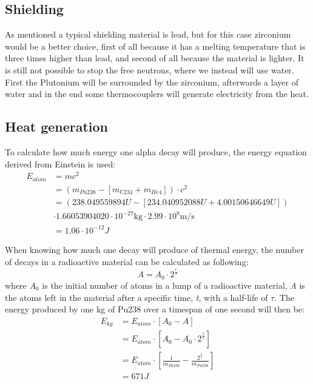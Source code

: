 \subsection{Shielding}
As mentioned a typical shielding material is lead, but for this case zirconium would be a better choice, first of all because it has a melting temperature that is three times higher than lead, and second of all because the material is lighter. It is still not possible to stop the free neutrons, where we instead will use water. First the Plutonium will be surrounded by the zirconium, afterwards a layer of water and in the end some thermocouplers will generate electricity from the heat. 

\subsection{Heat generation}

To calculate how much energy one alpha decay will produce, the energy equation derived from Einstein is used:
\begin{equation}
\begin{aligned} 
\text{$E_{atom}$} & ={} mc^2 \\
& = (m_{Pu238} - [m_{U234} + m_{He4}]) \cdot c^2 \\
& = (238.049559894U - [234.040952088U + 4.00150646649U])\\
& \cdot 1.66053904020\cdot 10^{-27}\text{kg} \cdot 2.99\cdot 10^8 \text{m/s}\\
& = 1.06\cdot 10^{-12} J 
\end{aligned}
\end{equation}

When knowing how much one decay will produce of thermal energy, the number of decays in a radioactive material can be calculated as following:
\begin{equation}
A = A_0 \cdot 2^{\frac{t}{\tau}}
\end{equation}
where \textit{$A_0$} is the initial number of atoms in a lump of a radioactive material, \textit{A} is the atoms left in the material after a specific time, \textit{t}, with a half-life of  \textit{$\tau$}. The energy produced by one kg of Pu238 over a timespan of one second will then be: 
\begin{equation}
\begin{aligned} 
\text{$E_{kg}$} & ={} E_{atom} \cdot [A_0 - A] \\
& = E_{atom} \cdot \left[A_0 - A_0 \cdot 2^{\frac{t}{\tau}}\right] \\
& = E_{atom}  \cdot \left[\frac{1}{m_{Pu238}} - \frac{2^{\frac{t}{\tau}}}{m_{Pu238}} \right] \\
& = 671 J
\end{aligned}
\end{equation}

